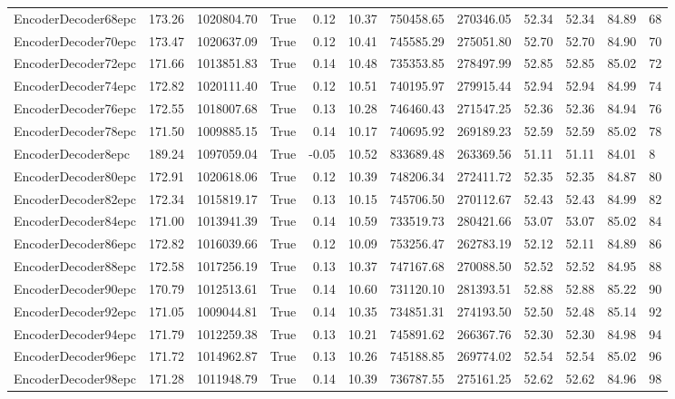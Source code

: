 \begin{tabular}{lrrlrrrrrrrl}
EncoderDecoder68epc & 173.26 & 1020804.70 & True & 0.12 & 10.37 & 750458.65 & 270346.05 & 52.34 & 52.34 & 84.89 & 68 \\
EncoderDecoder70epc & 173.47 & 1020637.09 & True & 0.12 & 10.41 & 745585.29 & 275051.80 & 52.70 & 52.70 & 84.90 & 70 \\
EncoderDecoder72epc & 171.66 & 1013851.83 & True & 0.14 & 10.48 & 735353.85 & 278497.99 & 52.85 & 52.85 & 85.02 & 72 \\
EncoderDecoder74epc & 172.82 & 1020111.40 & True & 0.12 & 10.51 & 740195.97 & 279915.44 & 52.94 & 52.94 & 84.99 & 74 \\
EncoderDecoder76epc & 172.55 & 1018007.68 & True & 0.13 & 10.28 & 746460.43 & 271547.25 & 52.36 & 52.36 & 84.94 & 76 \\
EncoderDecoder78epc & 171.50 & 1009885.15 & True & 0.14 & 10.17 & 740695.92 & 269189.23 & 52.59 & 52.59 & 85.02 & 78 \\
EncoderDecoder8epc & 189.24 & 1097059.04 & True & -0.05 & 10.52 & 833689.48 & 263369.56 & 51.11 & 51.11 & 84.01 & 8 \\
EncoderDecoder80epc & 172.91 & 1020618.06 & True & 0.12 & 10.39 & 748206.34 & 272411.72 & 52.35 & 52.35 & 84.87 & 80 \\
EncoderDecoder82epc & 172.34 & 1015819.17 & True & 0.13 & 10.15 & 745706.50 & 270112.67 & 52.43 & 52.43 & 84.99 & 82 \\
EncoderDecoder84epc & 171.00 & 1013941.39 & True & 0.14 & 10.59 & 733519.73 & 280421.66 & 53.07 & 53.07 & 85.02 & 84 \\
EncoderDecoder86epc & 172.82 & 1016039.66 & True & 0.12 & 10.09 & 753256.47 & 262783.19 & 52.12 & 52.11 & 84.89 & 86 \\
EncoderDecoder88epc & 172.58 & 1017256.19 & True & 0.13 & 10.37 & 747167.68 & 270088.50 & 52.52 & 52.52 & 84.95 & 88 \\
EncoderDecoder90epc & 170.79 & 1012513.61 & True & 0.14 & 10.60 & 731120.10 & 281393.51 & 52.88 & 52.88 & 85.22 & 90 \\
EncoderDecoder92epc & 171.05 & 1009044.81 & True & 0.14 & 10.35 & 734851.31 & 274193.50 & 52.50 & 52.48 & 85.14 & 92 \\
EncoderDecoder94epc & 171.79 & 1012259.38 & True & 0.13 & 10.21 & 745891.62 & 266367.76 & 52.30 & 52.30 & 84.98 & 94 \\
EncoderDecoder96epc & 171.72 & 1014962.87 & True & 0.13 & 10.26 & 745188.85 & 269774.02 & 52.54 & 52.54 & 85.02 & 96 \\
EncoderDecoder98epc & 171.28 & 1011948.79 & True & 0.14 & 10.39 & 736787.55 & 275161.25 & 52.62 & 52.62 & 84.96 & 98 \\
\bottomrule
\end{tabular}
